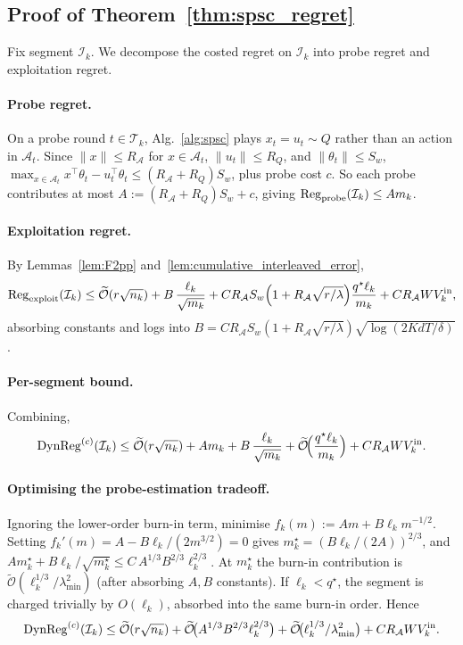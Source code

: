 \documentclass{article}
\newcommand{\cA}{\mathcal{A}}
\newcommand{\cT}{\mathcal{T}}
\newcommand{\cI}{\mathcal{I}}
\newcommand{\tilO}{\widetilde{\mathcal{O}}}
\newcommand{\DynReg}{\mathrm{DynReg}}
\begin{document}
\subsection{Proof of Theorem~\ref{thm:spsc_regret}}
\label{app:proof_main}

Fix segment $\cI_k$. We decompose the costed regret on $\cI_k$ into
probe regret and exploitation regret.

\paragraph{Probe regret.}
On a probe round $t\in\cT_k$, Alg.~\ref{alg:spsc} plays
$x_t=u_t\sim Q$ rather than an action in $\cA_t$. Since
$\|x\|\le R_\cA$ for $x\in\cA_t$, $\|u_t\|\le R_Q$, and
$\|\theta_t\|\le S_w$, $\max_{x\in\cA_t}x^\top\theta_t-u_t^\top\theta_t\le(R_\cA+R_Q)S_w$,
plus probe cost $c$. So each probe contributes at most
$A:=(R_\cA+R_Q)S_w+c$, giving
$\mathrm{Reg}_{\rm probe}(\cI_k)\le A m_k$.

\paragraph{Exploitation regret.}
By Lemmas~\ref{lem:F2pp} and~\ref{lem:cumulative_interleaved_error},
\[
\mathrm{Reg}_{\rm exploit}(\cI_k)
\le \tilO(r\sqrt{n_k})
+ B\,\frac{\ell_k}{\sqrt{m_k}}
+ C R_\cA S_w\Bigl(1+R_\cA\sqrt{r/\lambda}\Bigr)\frac{q^\star\ell_k}{m_k}
+ C R_\cA W V_k^{\rm in},
\]
absorbing constants and logs into
$B=C R_\cA S_w(1+R_\cA\sqrt{r/\lambda})\sqrt{\log(2KdT/\delta)}$.

\paragraph{Per-segment bound.} Combining,
\begin{equation}
\DynReg^{(c)}(\cI_k)
\le \tilO(r\sqrt{n_k})
+ A m_k + B\,\frac{\ell_k}{\sqrt{m_k}}
+ \tilO\!\Bigl(\frac{q^\star\ell_k}{m_k}\Bigr)
+ C R_\cA W V_k^{\rm in}.
\label{eq:per_segment}
\end{equation}

\paragraph{Optimising the probe-estimation tradeoff.}
Ignoring the lower-order burn-in term, minimise
$f_k(m):=A m+B \ell_k m^{-1/2}$. Setting
$f_k'(m)=A-B\ell_k/(2m^{3/2})=0$ gives
$m_k^\star=(B\ell_k/(2A))^{2/3}$, and
$A m_k^\star+B\ell_k/\sqrt{m_k^\star}\le C\,A^{1/3}B^{2/3}\ell_k^{2/3}$.
At $m_k^\star$ the burn-in contribution is
$\tilO(\ell_k^{1/3}/\lambda_{\min}^2)$ (after absorbing $A,B$
constants). If $\ell_k<q^\star$, the segment is charged trivially by
$O(\ell_k)$, absorbed into the same burn-in order. Hence
\begin{equation}
\DynReg^{(c)}(\cI_k)
\le \tilO(r\sqrt{n_k})
+ \tilO\!\bigl(A^{1/3}B^{2/3}\ell_k^{2/3}\bigr)
+ \tilO\!\bigl(\ell_k^{1/3}/\lambda_{\min}^2\bigr)
+ C R_\cA W V_k^{\rm in}.
\label{eq:per_segment_opt}
\end{equation}
\end{document}
